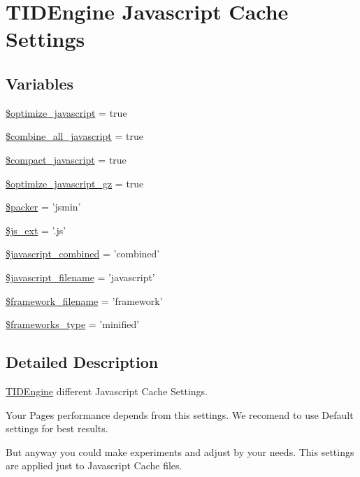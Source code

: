 \hypertarget{group__js__cache__settings}{
\section{TIDEngine Javascript Cache Settings}
\label{group__js__cache__settings}
}
\subsection*{Variables}
\begin{DoxyCompactItemize}
\item 
\hyperlink{group__js__cache__settings_gaf2d235fefcbea23d664080143edad37f}{\$optimize\_\-javascript} = true
\item 
\hyperlink{group__js__cache__settings_ga73a53fbf95bca0dd45d7b6cca1f6a689}{\$combine\_\-all\_\-javascript} = true
\item 
\hyperlink{group__js__cache__settings_ga8090fbc1c574d4134d6ab4b973d170d0}{\$compact\_\-javascript} = true
\item 
\hyperlink{group__js__cache__settings_ga0cdc0ded508ad7f1a3cfc63ef1df780a}{\$optimize\_\-javascript\_\-gz} = true
\item 
\hyperlink{group__js__cache__settings_ga16b8a20321620dbef3a8deb7462ef4f4}{\$packer} = 'jsmin'
\item 
\hyperlink{group__js__cache__settings_ga0d34488b74d51638331cf68641b18369}{\$js\_\-ext} = '.js'
\item 
\hyperlink{group__js__cache__settings_ga08f8005b517d19f5a2d099d7ec595e2d}{\$javascript\_\-combined} = 'combined'
\item 
\hyperlink{group__js__cache__settings_ga38703f3ad6532639e4ec66aaa9ffc03b}{\$javascript\_\-filename} = 'javascript'
\item 
\hyperlink{group__js__cache__settings_ga79efa8f1523c6f83cffbe8d18366a0f3}{\$framework\_\-filename} = 'framework'
\item 
\hyperlink{group__js__cache__settings_ga74a35165f016f24e125268a1e122c14f}{\$frameworks\_\-type} = 'minified'
\end{DoxyCompactItemize}


\subsection{Detailed Description}
\hyperlink{class_t_i_d_engine}{TIDEngine} different Javascript Cache Settings.

Your Pages performance depends from this settings. We recomend to use Default settings for best results.\par
\par
 But anyway you could make experiments and adjust by your needs. This settings are applied just to Javascript Cache files. 

